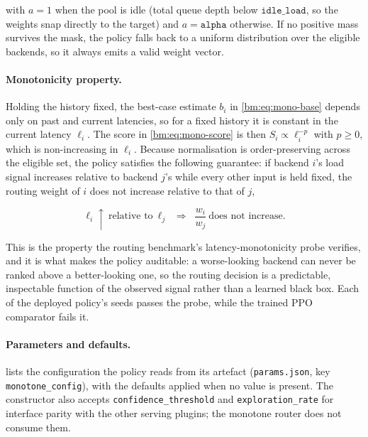 with $a = 1$ when the pool is idle (total queue depth below $\texttt{idle\_load}$,
so the weights snap directly to the target) and $a = \texttt{alpha}$ otherwise.
If no positive mass survives the mask, the policy falls back to a uniform
distribution over the eligible backends, so it always emits a valid weight
vector.

\paragraph{Monotonicity property.} Holding the history fixed, the best-case
estimate $b_i$ in \cref{bm:eq:mono-base} depends only on past and current
latencies, so for a fixed history it is constant in the current latency $\ell_i$.
The score in \cref{bm:eq:mono-score} is then $S_i \propto \ell_i^{-p}$ with
$p \ge 0$, which is non-increasing in $\ell_i$. Because normalisation is
order-preserving across the eligible set, the policy satisfies the following
guarantee: if backend $i$'s load signal increases relative to backend $j$'s
while every other input is held fixed, the routing weight of $i$ does not
increase relative to that of $j$,

\begin{equation}\label{bm:eq:mono-property}
  \ell_i \uparrow \ \text{relative to}\ \ell_j
  \;\;\Longrightarrow\;\;
  \frac{w_i}{w_j}\ \text{does not increase.}
\end{equation}

This is the property the routing benchmark's latency-monotonicity probe verifies,
and it is what makes the policy auditable: a worse-looking backend can never be
ranked above a better-looking one, so the routing decision is a predictable,
inspectable function of the observed signal rather than a learned black box. Each
of the deployed policy's seeds passes the probe, while the trained PPO comparator
fails it.

\paragraph{Parameters and defaults.}  lists the
configuration the policy reads from its artefact (\texttt{params.json}, key
\texttt{monotone\_config}), with the defaults applied when no value is present.
The constructor also accepts \texttt{confidence\_threshold} and
\texttt{exploration\_rate} for interface parity with the other serving plugins;
the monotone router does not consume them.

